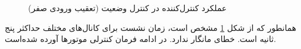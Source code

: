 \begin{figure}[H]
	\centering
{}
	\caption{‫‪عملکرد کنترل‌کننده  در کنترل وضعیت (تعقیب ورودی صفر)}
	\label{lqidg_roll_pitch_yaw_fig_simulation_ll}
\end{figure}
همانطور که از شکل
\ref{lqidg_roll_pitch_yaw_fig_simulation_ll}
مشخص است، زمان نشست برای کانال‌های مختلف حداکثر پنج ثانیه است. خطای مانگار ندارد. در ادامه فرمان کنترلی موتورها آورده شده‌است.

